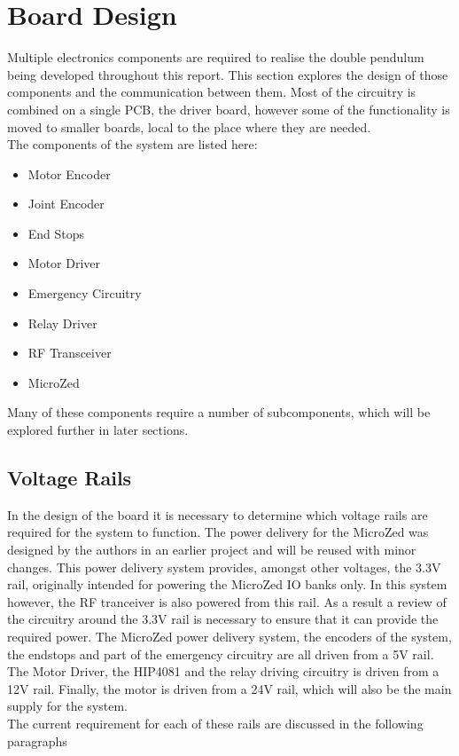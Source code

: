\section{Board Design} %
\label{sec:board_design}
Multiple electronics components are required to realise the double pendulum being developed throughout this report.
This section explores the design of those components and the communication between them.
Most of the circuitry is combined on a single PCB, the driver board, however some of the functionality is moved to smaller boards, local to the place where they are needed.\\

The components of the system are listed here:
\begin{itemize}
	\item Motor Encoder
	\item Joint Encoder
	\item End Stops
	\item Motor Driver
	\item Emergency Circuitry
	\item Relay Driver
	\item RF Transceiver
	\item MicroZed 
\end{itemize}
Many of these components require a number of subcomponents, which will be explored further in later sections.

\subsection{Voltage Rails} %
\label{sub:voltage_rails}
In the design of the board it is necessary to determine which voltage rails are required for the system to function.
The power delivery for the MicroZed was designed by the authors in an earlier project \cite{isaswarm} and will be reused with minor changes.
This power delivery system provides, amongst other voltages, the 3.3V rail, originally intended for powering the MicroZed IO banks only.
In this system however, the RF tranceiver is also powered from this rail.
As a result a review of the circuitry around the 3.3V rail is necessary to ensure that it can provide the required power.
The MicroZed power delivery system, the encoders of the system, the endstops and part of the emergency circuitry are all driven from a 5V rail.
The Motor Driver, the HIP4081 and the relay driving circuitry is driven from a 12V rail.
Finally, the motor is driven from a 24V rail, which will also be the main supply for the system.\\
The current requirement for each of these rails are discussed in the following paragraphs

